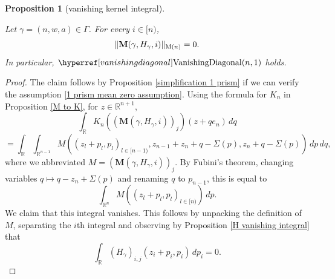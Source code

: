 \documentclass[12pt,reqno]{amsart}
\theoremstyle{plain}
\newtheorem{proposition}[theorem]{Proposition}
\numberwithin{equation}{section}
\theoremstyle{remark}
\newcommand{\uses}[1]{}
\newcommand{\usesdefs}[1]{}
\newcommand{\leanok}{}
\newcommand{\lean}[1]{}
\newcommand{\R}{{\mathbb R}}
\newcommand{\M}{\mathbf{M}}
\begin{document}
\begin{proposition}[vanishing kernel integral]\label{vanishing kernel integral}\uses{simplification 1 prism,H vanishing integral,M to K}\usesdefs{geometric parameters,kernel sequences,sandwich kernel,H multiplier,vanishing diagonal}
\lean{Auto.vanishingKernelIntegral}
\leanok
Let $\gamma=(n,w,a)\in \Gamma$.
For every $i\in [n)$,
\begin{equation}\label{auto:terminal-H-prism-form-zero}
    \|\M(\gamma,H_\gamma,i)\|_{{\rm M}(n)}=0.
\end{equation}
In particular, $\VanishingDiagonal{n,1}$ holds.
\end{proposition}

\begin{proof}
The claim follows by Proposition \ref{simplification 1 prism} if we can verify the assumption \eqref{1 prism mean zero assumption}.
Using the formula for $K_n$ in Proposition \ref{M to K}, for $z\in \R^{n+1}$,
\begin{equation}
\int_\R K_n((\M(\gamma,H_\gamma,i))_j)(z+qe_n)\,dq
\end{equation}
\begin{equation}
=\int_\R \int_{\R^{n-1}}  M((z_{l}+p_{l},p_{l})_{l\in [n-1)}, z_{n-1}+z_{n}+q-\Sigma(p),z_{n}+q-\Sigma(p))\,dp\,dq,
\end{equation}
where we abbreviated $M=(\M(\gamma,H_\gamma, i))_j$.
By Fubini's theorem, changing variables $q\mapsto q - z_n + \Sigma(p)$ and renaming $q$ to $p_{n-1}$, this is equal to
\begin{equation}
\int_{\R^{n}}  M((z_{l}+p_{l},p_{l})_{l\in [n)})
 \,dp.
\end{equation}
We claim that this integral vanishes. This follows by unpacking the definition of $M$, separating the $i$th integral and
observing by Proposition \ref{H vanishing integral} that
\begin{equation}
        \int_{\R}  (H_\gamma)_{i,j}(z_{i}+p_{i},p_{i})
     \,dp_i=0.
\end{equation}
\end{proof}
\end{document}
